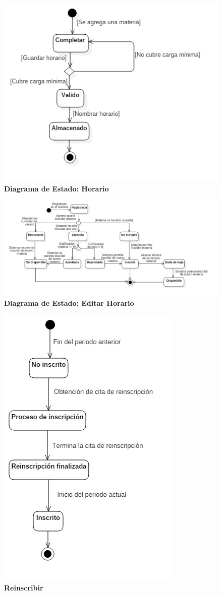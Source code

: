 \begin{figure}[H]
  \centering
    \includegraphics[scale=1,angle=0]{project/Estado/crear_horario.png}
  \caption{\textbf{Diagrama de Estado: Horario}}
\end{figure}
\begin{figure}[H]
  \centering
    \includegraphics[scale=0.35,angle=0]{project/Estado/E_editar_horario.jpg}
  \caption{\textbf{Diagrama de Estado: Editar Horario}}
\end{figure}
\begin{figure}[H]
  \centering
    \includegraphics[scale=1,angle=0]{project/Estado/estado_inscripcion.jpg}
  \caption{\textbf{Reinscribir}}
\end{figure}